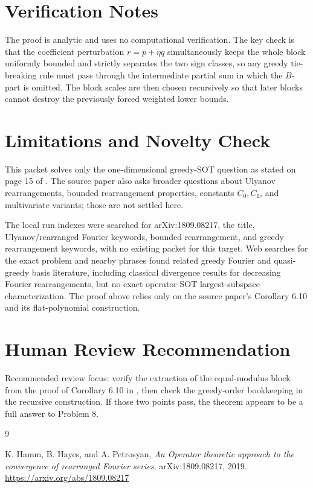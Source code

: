\documentclass[11pt]{article}
\begin{document}
\section*{Verification Notes}

The proof is analytic and uses no computational verification. The key check is that the coefficient perturbation \(r=p+\eta q\) simultaneously keeps the whole block uniformly bounded and strictly separates the two sign classes, so any greedy tie-breaking rule must pass through the intermediate partial sum in which the \(B\)-part is omitted. The block scales are then chosen recursively so that later blocks cannot destroy the previously forced weighted lower bounds.

\section*{Limitations and Novelty Check}

This packet solves only the one-dimensional greedy-SOT question as stated on page 15 of \cite{HHP}. The source paper also asks broader questions about Ulyanov rearrangements, bounded rearrangement properties, constants \(C_0,C_1\), and multivariate variants; those are not settled here.

The local run indexes were searched for arXiv:1809.08217, the title, Ulyanov/rearranged Fourier keywords, bounded rearrangement, and greedy rearrangement keywords, with no existing packet for this target. Web searches for the exact problem and nearby phrases found related greedy Fourier and quasi-greedy basis literature, including classical divergence results for decreasing Fourier rearrangements, but no exact operator-SOT largest-subspace characterization. The proof above relies only on the source paper's Corollary 6.10 and its flat-polynomial construction.

\section*{Human Review Recommendation}

Recommended review focus: verify the extraction of the equal-modulus block from the proof of Corollary 6.10 in \cite{HHP}, then check the greedy-order bookkeeping in the recursive construction. If those two points pass, the theorem appears to be a full answer to Problem 8.

\begin{thebibliography}{9}

K. Hamm, B. Hayes, and A. Petrosyan,
\emph{An Operator theoretic approach to the convergence of rearranged Fourier series},
arXiv:1809.08217, 2019.
\url{https://arxiv.org/abs/1809.08217}

\end{thebibliography}
\end{document}

